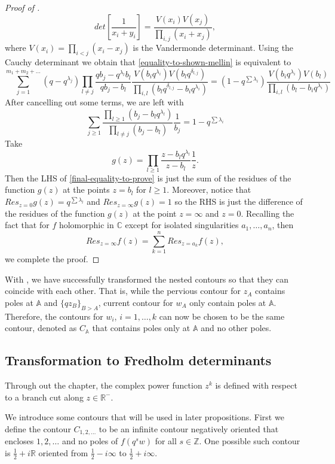\begin{proof}[Proof of ]
$$det\left[ \frac{1}{x_i + y_i} \right] = \frac{V(x_i) V(x_j)}{\prod_{i,j} (x_i + x_j)},$$ where $V(x_i) = \prod_{i<j} (x_i - x_j)$ is the Vandermonde determinant. Using the Cauchy determinant we obtain that \eqref{equality-to-shown-mellin} is equivalent to
$$ \sum_{j=1}^{m_1 + m_2 + \dots} (q - q^{\lambda_j}) \prod_{l \neq j} \frac{qb_j - q^{\lambda_l} b_l}{qb_j - b_l} \frac{V(b_i q^{\lambda_i}) V(b_l q^{\delta_{l,j}})}{\prod_{i,l} (b_l q^{\delta_{l,j}} - b_i q^{\lambda_i})} = (1-q^{ \sum \lambda_i }) \frac{V(b_i q^{\lambda_i}) V(b_l)}{\prod_{i,l} (b_l - b_i q^{\lambda_i})}$$
After cancelling out some terms, we are left with 
\begin{equation}
\label{final-equality-to-prove}
\sum_{j \ge 1} \frac{\prod_{l \ge 1} (b_j - b_l q^{\lambda_l})}{\prod_{l \neq j} (b_j - b_l)} \frac{1}{b_j} = 1 - q^{\sum \lambda_i}
\end{equation}
Take $$g(z) = \prod_{l \ge 1} \frac{z - b_l q^{\lambda_l}}{z - b_l} \frac{1}{z}.$$ Then the LHS of \eqref{final-equality-to-prove} is just the sum of the residues of the function $g(z)$ at the points $z = b_l$ for $l \ge 1$. Moreover, notice that $Res_{z = 0} g(z) = q^{\sum \lambda_l}$ and $Res_{z = \infty} g(z) = 1$ so the RHS is just the difference of the residues of the function $g(z)$ at the point $z = \infty$ and $z = 0$. Recalling the fact that for $f$ holomorphic in $\mathbb{C}$ except for isolated singularities $a_1, \dots, a_n$, then $$Res_{z = \infty} f(z) = \sum_{k = 1}^{n} Res_{z = a_k} f(z),$$ we complete the proof.
\end{proof}

With , we have successfully transformed the nested contours so that they can coincide with each other. That is, while the pervious contour for $z_A$ contains poles at $\mathbb{A}$ and $\{qz_B\}_{B>A}$, current contour for $w_A$ only contain poles at $\mathbb{A}$. Therefore, the contours for $w_i$, $i = 1, \dots, k$ can now be chosen to be the same contour, denoted as $C_{\mathbb{A}}$ that contains poles only at $\mathbb{A}$ and no other poles. 

\subsection{Transformation to Fredholm determinants}
\label{transformation-to-fd}
Through out the chapter, the complex power function $z^k$ is defined with respect to a branch cut along $z \in \mathbb{R}^-$.

We introduce some contours that will be used in later propositions. First we define the contour $C_{1,2,\dots}$ to be an infinite contour negatively oriented that encloses $1,2,\dots$ and no poles of $f(q^sw)$ for all $s \in \mathbb{Z}$. One possible such contour is $\frac{1}{2} + i\mathbb{R}$ oriented from $\frac{1}{2} - i\infty$ to $\frac{1}{2} + i\infty$. 

